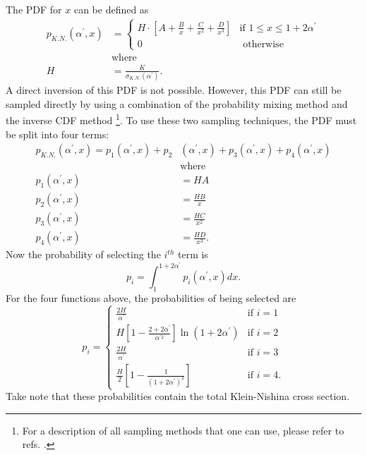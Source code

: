 The PDF for $x$ can be defined as
\begin{align}
  p_{K.N.}(\alpha^{'},x) & = 
  \begin{cases}
    H \cdot \left[ A + \frac{B}{x} + \frac{C}{x^2} + \frac{D}{x^3} \right]
    & \text{if } 1 \leq x \leq 1 + 2 \alpha^{'} \\
    0 & \text{ otherwise}
  \end{cases} \\
  & \text{where} \nonumber \\
  H & = \frac{K}{\sigma_{K.N.}(\alpha^{'})}. \nonumber 
\end{align}
A direct inversion of this PDF is not possible. However, this PDF can still be
sampled directly by using a combination of the probability mixing method and the
inverse CDF method \citep{koblinger_direct_1975}\footnote{For a description of 
all sampling methods that one can use, please refer to refs. \citep{koblinger_direct_1975, lux_monte_1991, spanier_monte_1969, blomquist_assessment_1983}.}. To
use these two sampling techniques, the PDF must be split into four terms: 
\begin{align}
  p_{K.N.}(\alpha^{'},x) = p_1(\alpha^{'},x) + p_2&(\alpha^{'},x) +
  p_3(\alpha^{'},x) + p_4(\alpha^{'},x) \\
  & \text{where} \nonumber \\
  p_1(\alpha^{'},x) & = HA \nonumber \\
  p_2(\alpha^{'},x) & = \frac{HB}{x} \nonumber \\
  p_3(\alpha^{'},x) & = \frac{HC}{x^2} \nonumber \\
  p_4(\alpha^{'},x) & = \frac{HD}{x^3}. \nonumber 
\end{align}
Now the probability of selecting the $i^{th}$ term is
\begin{equation}
  p_i = \int_1^{1+2\alpha^{'}} p_i(\alpha^{'},x) dx.
\end{equation}
For the four functions above, the probabilities of being selected are 
\begin{equation}
  p_i = 
  \begin{cases}
    \frac{2H}{\alpha^{'}} & \text{if } i = 1 \\
    H \left[1 - \frac{2+2\alpha^{'}}{\alpha^{'2}} \right] \ln{(1 + 2\alpha^{'})} 
    & \text{if } i = 2 \\
    \frac{2H}{\alpha^{'}} & \text{if } i = 3 \\
    \frac{H}{2} \left[1 - \frac{1}{(1+2\alpha^{'})^2} \right] & \text{if } i = 4.
    \end{cases}
\end{equation}
Take note that these probabilities contain the total Klein-Nishina cross 
section.

